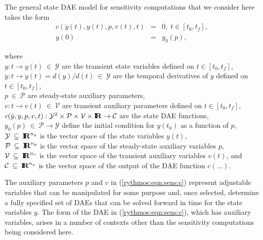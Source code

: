 \documentclass[pdf,ps2pdf,11pt]{SANDreport}
\begin{document}
The general state DAE model for sensitivity computations that we
consider here takes the form
%
\begin{eqnarray}
c\left( \dot{y}(t), y(t), p, v(t), t \right) & = & 0,
\; t \in \left[ t_0, t_f \right], \label{rythmos:eqn:sens:c} \\
y(0) & = & y_0(p), \label{rythmos:eqn:sens:c:ic}
\end{eqnarray}
\begin{tabbing}
\hspace{4ex}where\hspace{1ex}\= \\
\>	$y : t \rightarrow y(t) \:\in\:\mathcal{Y}$ are the transient state variables defined on $t\in[t_0,t_f]$, \\
\>	$\dot{y} : t \rightarrow \dot{y}(t) = d(y)/d(t)\:\in\:\mathcal{Y}$ are the temporal derivatives of $y$ defined on $t\in[t_0,t_f]$, \\
\>	$p \:\in\:\mathcal{P}$ are steady-state auxiliary parameters, \\
\>	$v : t \rightarrow v(t) \:\in\:\mathcal{V}$ are transient auxiliary parameters defined on $t\in[t_0,t_f]$, \\
\>	$c(\dot{y}, y, p, v, t) :
		\mathcal{Y}^2 \times \mathcal{P} \times \mathcal{V} \times \mbox{\textbf{I}}\hspace{-0.6ex}\mbox{\textbf{R}}
		\rightarrow \mathcal{C}$ are the state DAE functions, \\
\>	$y_0(p) \:\in\:\mathcal{P} \rightarrow \mathcal{Y}$ define the initial condition for $y(t_0)$ as a function of $p$, \\
\>	$\mathcal{Y} \:\subseteq\:\mbox{\textbf{I}}\hspace{-0.6ex}\mbox{\textbf{R}}^{n_y}$ is the vector space of the state variables $y(t)$, \\
\>	$\mathcal{P} \:\subseteq\:\mbox{\textbf{I}}\hspace{-0.6ex}\mbox{\textbf{R}}^{n_p}$ is the vector space of the steady-state auxiliary variables $p$, \\
\>	$\mathcal{V} \:\subseteq\:\mbox{\textbf{I}}\hspace{-0.6ex}\mbox{\textbf{R}}^{n_v}$ is the vector space of the transient auxiliary variables $v(t)$, and \\
\>	$\mathcal{C} \:\subseteq\:\mbox{\textbf{I}}\hspace{-0.6ex}\mbox{\textbf{R}}^{n_y}$ is the vector space of the output of the DAE function $c(\ldots)$.
\end{tabbing}

The auxiliary parameters $p$ and $v$ in (\ref{rythmos:eqn:sens:c}) represent
adjustable variables that can be manipulated for some purpose and, once
selected, determine a fully specified set of DAEs that can be solved forward
in time for the state variables $y$.  The form of the DAE in
(\ref{rythmos:eqn:sens:c}), which has auxiliary variables, arises in a number
of contexts other than the sensitivity computations being considered here.
\end{document}
